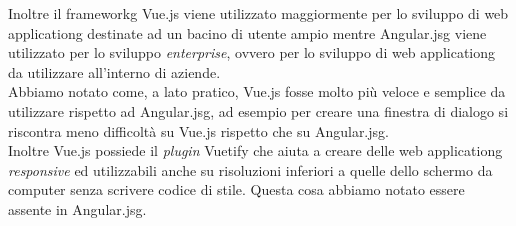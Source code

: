 Inoltre il \gls{frameworkg} Vue.js viene utilizzato maggiormente per lo sviluppo di \gls{web applicationg} destinate ad un bacino di utente ampio mentre \gls{Angular.jsg} viene utilizzato per lo sviluppo \textit{enterprise}, ovvero per lo sviluppo di \gls{web applicationg} da utilizzare all'interno di aziende.\\
Abbiamo notato come, a lato pratico, Vue.js fosse molto più veloce e semplice da utilizzare rispetto ad \gls{Angular.jsg}, ad esempio per creare una finestra di dialogo si riscontra meno difficoltà su Vue.js rispetto che su \gls{Angular.jsg}.\\
Inoltre Vue.js possiede il \textit{plugin} Vuetify che aiuta a creare delle \gls{web applicationg} \textit{responsive} ed utilizzabili anche su risoluzioni inferiori a quelle dello schermo da computer senza scrivere codice di stile. Questa cosa abbiamo notato essere assente in \gls{Angular.jsg}.



